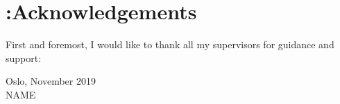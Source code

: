 \chapter*{{\color{red} :}Acknowledgements}
%
First and foremost, I would like to thank all my supervisors for guidance and support: \\

%
\begin{flushright}
Oslo, November 2019\\
NAME
\end{flushright}

